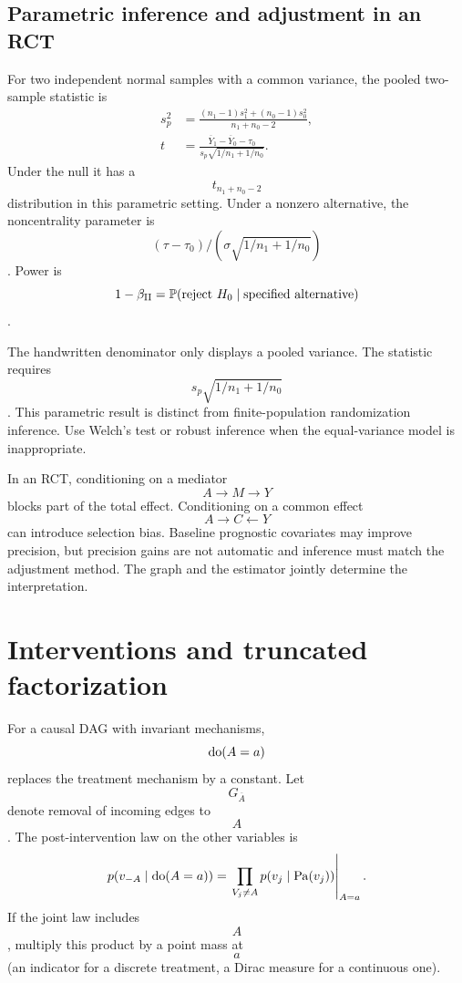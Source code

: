 \subsection{Parametric inference and adjustment in an RCT}
For two independent normal samples with a common variance, the pooled two-sample statistic is
\begin{align}
s_p^2&=\frac{(n_1-1)s_1^2+(n_0-1)s_0^2}{n_1+n_0-2},\\
t&=\frac{\overline Y_1-\overline Y_0-\tau_0}{s_p\sqrt{1/n_1+1/n_0}}.
\end{align}
Under the null it has a $$t_{n_1+n_0-2}$$ distribution in this parametric setting. Under a nonzero alternative, the noncentrality parameter is $$(\tau-\tau_0)/(\sigma\sqrt{1/n_1+1/n_0})$$. Power is $$1-\beta_{\mathrm{II}}=\mathbb P(\text{reject }H_0\mid\text{specified alternative})$$.
\begin{correction}
The handwritten denominator only displays a pooled variance. The statistic requires $$s_p\sqrt{1/n_1+1/n_0}$$. This parametric result is distinct from finite-population randomization inference. Use Welch's test or robust inference when the equal-variance model is inappropriate.
\end{correction}
In an RCT, conditioning on a mediator $$A\to M\to Y$$ blocks part of the total effect. Conditioning on a common effect $$A\to C\leftarrow Y$$ can introduce selection bias. Baseline prognostic covariates may improve precision, but precision gains are not automatic and inference must match the adjustment method. The graph and the estimator jointly determine the interpretation.

\section{Interventions and truncated factorization}
For a causal DAG with invariant mechanisms, $$\operatorname{do}(A=a)$$ replaces the treatment mechanism by a constant. Let $$G_{\overline A}$$ denote removal of incoming edges to $$A$$. The post-intervention law on the other variables is
\begin{equation}
p(v_{-A}\mid\operatorname{do}(A=a))=
\left.\prod_{V_j\neq A}p(v_j\mid\operatorname{Pa}(v_j))\right|_{A=a}.
\end{equation}
If the joint law includes $$A$$, multiply this product by a point mass at $$a$$ (an indicator for a discrete treatment, a Dirac measure for a continuous one).

